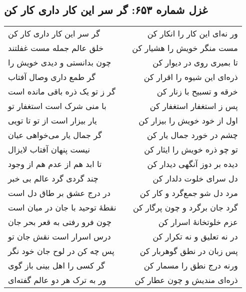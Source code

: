 \begin{center}
\section*{غزل شماره ۶۵۳: گر سر این کار داری کار کن}
\label{sec:653}
\begin{longtable}{l p{0.5cm} r}
گر سر این کار داری کار کن
&&
ور نه‌ای این کار را انکار کن
\\
خلق عالم جمله مست غفلتند
&&
مست منگر خویش را هشیار کن
\\
چون بدانستی و دیدی خویش را
&&
تا بمیری روی در دیوار کن
\\
گر طمع داری وصال آفتاب
&&
ذره‌ای این شیوه را اقرار کن
\\
گر ز تو یک ذره باقی مانده است
&&
خرقه و تسبیح با زنار کن
\\
با منی شرک است استغفار تو
&&
پس ز استغفار استغفار کن
\\
یار بیزار است از تو تا تویی
&&
اول از خود خویش را بیزار کن
\\
گر جمال یار می‌خواهی عیان
&&
چشم در خورد جمال یار کن
\\
نیست پنهان آفتاب لایزال
&&
تو چو ذره خویش را ایثار کن
\\
تا ابد هم از عدم هم از وجود
&&
دیده بر دوز آنگهی دیدار کن
\\
چند گردی گرد عالم بی خبر
&&
دل سرای خلوت دلدار کن
\\
در درج عشق بر طاق دل است
&&
مرد دل شو جمع‌گرد و کار کن
\\
نقطهٔ توحید با جان در میان است
&&
گرد جان برگرد و چون پرگار کن
\\
چون فرو رفتی به قعر بحر جان
&&
عزم خلوتخانهٔ اسرار کن
\\
درس اسرار است نقش جان تو
&&
در نه تعلیق و نه تکرار کن
\\
پس چه کن در لوح جان خود نگر
&&
پس زبان در نطق گوهربار کن
\\
گر کسی را اهل بینی باز گوی
&&
ورنه درج نطق را مسمار کن
\\
ور به ترک هر دو عالم گفته‌ای
&&
ذره‌ای مندیش و چون عطار کن
\\
\end{longtable}
\end{center}
